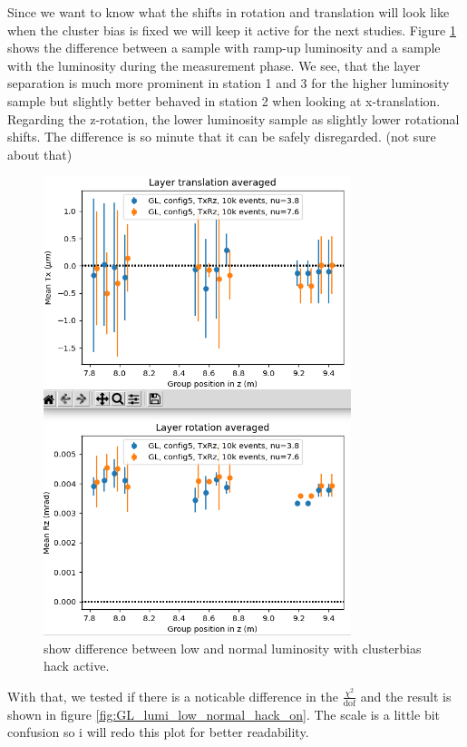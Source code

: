 Since we want to know what the shifts in rotation and translation will look like when the cluster bias is fixed we will keep it active for the next studies.
Figure \ref{fig:lumi_low_normal_hack_on} shows the difference between a sample with ramp-up luminosity and a sample with the luminosity during the measurement phase.
We see, that the layer separation is much more prominent in station 1 and 3 for the higher luminosity sample but slightly better behaved in station 2 when looking at x-translation.
Regarding the z-rotation, the lower luminosity sample as slightly lower rotational shifts.
The difference is so minute that it can be safely disregarded. (not sure about that)

\begin{figure}
  \centering
  \includegraphics[width=0.8\textwidth]{plots/jan_24_2022/low_normal_with_hack.png}
  \caption{show difference between low and normal luminosity with clusterbias hack active.}
  \label{fig:lumi_low_normal_hack_on}
\end{figure}

With that, we tested if there is a noticable difference in the $\frac{\chi^2}{\text{dof}}$
and the result is shown in figure \ref{fig:GL_lumi_low_normal_hack_on}. The
scale is a little bit confusion so i will redo this plot for better readability.

